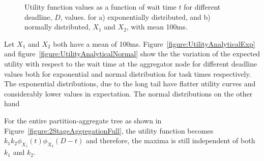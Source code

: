\documentclass[letterpaper,twocolumn,10pt]{article}
\begin{document}
\begin{figure}[!t]
\centering
{}
\vspace{0.1in}
\caption{\small Utility function values as a function of wait time $t$ for different deadline, $D$, values. for a) exponentially distributed, and b) normally distributed, $X_1$ and $X_2$, with mean 100ms.}
\end{figure}

Let $X_1$ and $X_2$ both have a mean of 100ms.%
Figure~\ref{figure:UtilityAnalyticalExp} and figure~\ref{figure:UtilityAnalyticalNormal} show the the variation of the expected utility with respect to the wait time at the aggregator node for different deadline values both for exponential and normal distribution for task times respectively. The exponential distributions, due to the long tail have flatter utility curves and considerably lower values in expectation. The normal distributions on the other hand

For the entire partition-aggregate tree as shown in Figure~\ref{figure:2StageAggregationFull}, the utility function becomes $k_1 k_2 \phi_{X_1}(t)\phi_{X_2}(D - t)$ and therefore, the maxima is still independent of both $k_1$ and $k_2$. 
\end{document}
